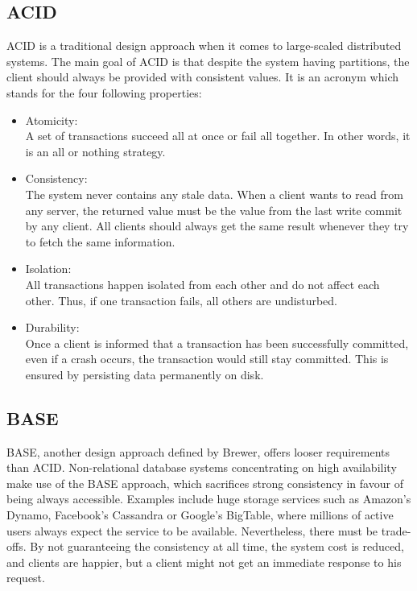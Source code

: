 \subsection{ACID}
\label{sec:background_acid}
ACID is a traditional design approach\cite{brewer2012cap} when it comes to large-scaled distributed systems. The main goal of ACID is that despite the system having partitions, the client should always be provided with consistent values. It is an acronym which stands for the four following properties:
\begin{itemize}
\item Atomicity:\\
A set of transactions succeed all at once or fail all together. In other words, it is an all or nothing strategy.
\item Consistency: \\
The system never contains any stale data. When a client wants to read from any server, the returned value must be the value from the last write commit by any client. All clients should always get the same result whenever they try to fetch the same information.
\item Isolation:\\
All transactions happen isolated from each other and do not affect each other. Thus, if one transaction fails, all others are undisturbed.
\item Durability:\\
Once a client is informed that a transaction has been successfully committed, even if a crash occurs, the transaction would still stay committed. This is ensured by persisting data permanently on disk.
\end{itemize} 

\subsection{BASE}
\label{sec:background_base}
BASE, another design approach defined by Brewer, offers looser requirements than ACID\cite{brewer2012cap}. Non-relational database systems concentrating on high availability make use of the BASE approach, which sacrifices strong consistency in favour of being always accessible. Examples include huge storage services such as Amazon's Dynamo, Facebook's Cassandra or Google's BigTable, where millions of active users always expect the service to be available\cite{kalid2017big}. Nevertheless, there must be trade-offs. By not guaranteeing the consistency at all time, the system cost is reduced, and clients are happier, but a client might not get an immediate response to his request.

